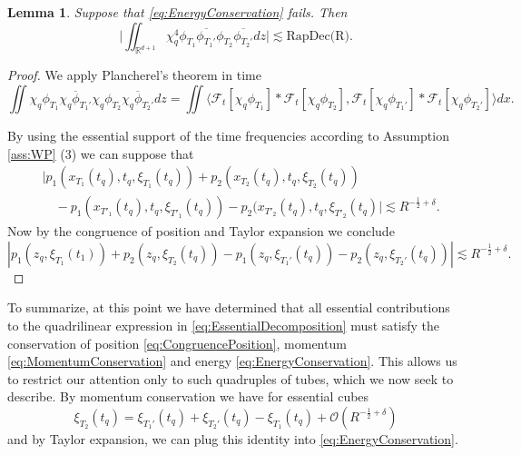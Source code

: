 \documentclass{amsart}
\newtheorem{lemma}[theorem]{Lemma}
\theoremstyle{definition}
\newcommand{\R}{\mathbb{R}}
\begin{document}
\begin{lemma}
Suppose that \eqref{eq:EnergyConservation} fails. Then
\begin{equation*}
\big| \iint_{\R^{d+1}} \chi_q^4 \phi_{T_1} \overline{\phi_{T_1'}} \phi_{T_2} \overline{\phi_{T_2'}} dz \big| \lesssim \text{RapDec(R)}.
\end{equation*}
\end{lemma}
\begin{proof}
We apply Plancherel's theorem in time
\begin{equation*}
\iint \chi_q \phi_{T_1} \overline{\chi_q \phi_{T_1'}} \chi_q \phi_{T_2} \overline{\chi_q \phi_{T_2'}} dz = \iint \langle \mathcal{F}_t[ \chi_q \phi_{T_1} ] * \mathcal{F}_t [ \chi_{q} \phi_{T_2} ], \mathcal{F}_t [ \chi_q \phi_{T_1'}] * \mathcal{F}_t [ \chi_q \phi_{T_2'}] \rangle dx.
\end{equation*}

By using the essential support of the time frequencies according to Assumption \ref{ass:WP} (3) we can suppose that
\begin{equation*}
\begin{split}
&\big| p_1(x_{T_1}(t_q),t_q, \xi_{T_1}(t_q)) + p_2(x_{T_2}(t_q),t_q,\xi_{T_2}(t_q)) \\
&\quad - p_1(x_{T'_1}(t_q),t_q, \xi_{T'_1}(t_q)) - p_2(x_{T'_2}(t_q),t_q,\xi_{T'_2}(t_q) \big| \lesssim R^{-\frac{1}{2}+\delta}.
\end{split}
\end{equation*}
Now by the congruence of position and Taylor expansion we conclude
\begin{equation*}
|p_1(z_q,\xi_{T_1}(t_1)) + p_2(z_q,\xi_{T_2}(t_q)) - p_1(z_q,\xi_{T_1'}(t_q)) - p_2(z_q,\xi_{T_2'}(t_q)) | \lesssim R^{-\frac{1}{2}+\delta}.
\end{equation*}

\end{proof}

 To summarize, at this point we have determined that all essential contributions to 
the quadrilinear expression in \eqref{eq:EssentialDecomposition} must satisfy the conservation of 
position \eqref{eq:CongruencePosition}, momentum \eqref{eq:MomentumConservation} and energy \eqref{eq:EnergyConservation}. This allows us to restrict our attention only to such quadruples of tubes, which we now seek to describe.
By momentum conservation we have for essential cubes 
\begin{equation*}
\xi_{T_2}(t_q) = \xi_{T_1'}(t_q)+\xi_{T_2'}(t_q) -\xi_{T_1}(t_q) + \mathcal{O}(R^{-\frac{1}{2}+\delta})
\end{equation*}
 and by Taylor expansion, we can plug this identity into \eqref{eq:EnergyConservation}.
\end{document}

